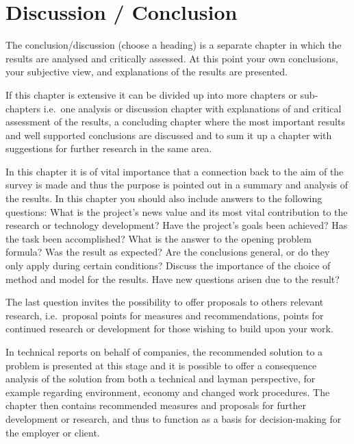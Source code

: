 \section{Discussion / Conclusion}\label{sec:conclusion}
The conclusion/discussion (choose a heading) is a separate chapter in which the
results are analysed and critically assessed. At this point your own
conclusions, your subjective view, and explanations of the results are
presented.

If this chapter is extensive it can be divided up into more chapters or
sub-chapters i.e.\ one analysis or discussion chapter with explanations of and
critical assessment of the results, a concluding chapter where the most
important results and well supported conclusions are discussed and to sum it up
a chapter with suggestions for further research in the same area.

In this chapter it is of vital importance that a connection back to the aim of
the survey is made and thus the purpose is pointed out in a summary and analysis
of the results.  In this chapter you should also include answers to the
following questions: What is the project's news value and its most vital
contribution to the research or technology development? Have the project’s goals
been achieved? Has the task been accomplished? What is the answer to the opening
problem formula? Was the result as expected? Are the conclusions general, or do
they only apply during certain conditions? Discuss the importance of the choice
of method and model for the results. Have new questions arisen due to the
result?

The last question invites the possibility to offer proposals to others relevant
research, i.e.\ proposal points for measures and recommendations, points for
continued research or development for those wishing to build upon your work.

In technical reports on behalf of companies, the recommended solution to a
problem is presented at this stage and it is possible to offer a consequence
analysis of the solution from both a technical and layman perspective, for
example regarding environment, economy and changed work procedures. The chapter
then contains recommended measures and proposals for further development or
research, and thus to function as a basis for decision-making for the employer
or client.

